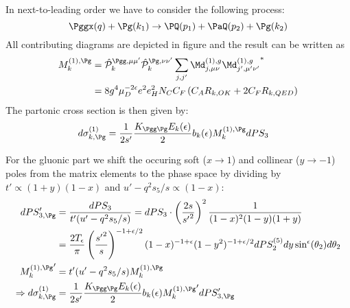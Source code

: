 \label{sec:NLO.g}
In next-to-leading order we have to consider the following process:
\begin{equation}
\Pggx(q) + \Pg(k_1) \rightarrow \PQ(p_1)+\PaQ(p_2) + \Pg(k_2)
\end{equation}
All contributing diagrams are depicted in figure  and the result can be written as
\begin{align}
M_k^{(1),\Pg} &= \hat {\mathcal P}_{k}^{\Pgg,\mu\mu'}\hat {\mathcal P}_{k}^{\Pg,\nu\nu'}\sum_{j,j'}{\Md^{(1),g}_{j,\mu\nu}\Md^{(1),g}_{j',\mu'\nu'}}^*\\
 &= 8g^4\mu_D^{-2\epsilon}e^2e_H^2 N_C C_F\left( C_A R_{k,OK} + 2C_F R_{k,QED}\right)
\end{align}
The partonic cross section is then given by:
\begin{align}
d\sigma_{k,\Pg}^{(1)} &= \frac{1}{2s'}\frac {K_{\Pgg\Pg}E_k(\epsilon)} 2 b_k(\epsilon) M_k^{(1),\Pg} dPS_{3}
\end{align}

For the gluonic part we shift the occuring soft ($x\rightarrow 1$) and collinear ($y\rightarrow -1$) poles from the matrix elements to the phase space by dividing by $t'\propto(1+y)(1-x)$ and $u'-q^2s_5/s\propto(1-x)$:
\begin{align}
dPS_{3,\Pg}' &= \frac{dPS_3}{t'(u'-q^2s_5/s)} = dPS_3 \cdot \left(\frac {2s}{{s'}^2}\right)^2\frac 1 {(1-x)^2(1-y)(1+y)}\\
 &= \frac {2T_\epsilon}{\pi} \left(\frac {{s'}^2} s\right)^{-1+\epsilon/2} (1-x)^{-1+\epsilon}(1-y^2)^{-1+\epsilon/2}dPS_2^{(5)}dy \sin^\epsilon(\theta_2)d\theta_2\\
{M_k^{(1),\Pg}}' &= t'(u'-q^2s_5/s)M_k^{(1),\Pg}\\
\Rightarrow d\sigma_{k,\Pg}^{(1)} &= \frac{1}{2s'}\frac {K_{\Pgg\Pg}E_k(\epsilon)} 2 b_k(\epsilon) {M_k^{(1),\Pg}}' dPS_{3,\Pg}'
\end{align}

